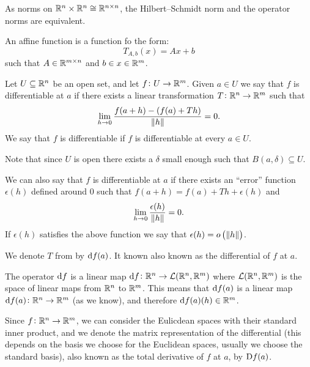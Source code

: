\documentclass[11pt,a4paper]{article}
\begin{document}
\begin{remark}
  As norms on $\mathbb{R}^{n} \times \mathbb{R}^{n} \cong \mathbb{R}^{n \times n}$,
  the Hilbert--Schmidt norm and the operator norms are equivalent.
\end{remark}

\begin{definition}
  An affine function is a function fo the form:
  \[
    T_{A,b}(x) = Ax + b
  \]
  such that $A\in\mathbb{R}^{m \times n}$ and $b\in x\in \mathbb{R}^m$.
\end{definition}
\begin{definition}
  \label{def:differentiable-function}
  Let $U \subseteq \mathbb{R}^n$ be an open set, and let $f \colon U \to \mathbb{R}^m$.
  Given $a \in U$ we say that $f$ is differentiable at $a$ if there exists
  a linear transformation $T \colon \mathbb{R}^n \to \mathbb{R}^m$ such that
  \[
    \lim_{h \to 0} \frac{f(a + h) - (f(a) + Th)}{\left\lVert h\right\rVert} = 0.
  \]
  We say that $f$ is differentiable
  if $f$ is differentiable at every $a \in U$.
\end{definition}
\begin{remark}
  Note that since $U$ is open there exists a $\delta$ small enough such
  that $B(a,\delta) \subseteq U$.
\end{remark}
\begin{remark}
  We can also say that $f$ is differentiable at $a$
  if there exists an ``error''
  function $\epsilon(h)$ defined around $0$ such that 
  $f(a + h) = f(a) + Th + \epsilon(h)$ and
  \[
    \lim_{h \to 0} \frac{\epsilon(h)}{\left\lVert h\right\rVert} = 0.
  \]
  If $\epsilon(h)$ satisfies the above function
  we say that $\epsilon(h) = o\del{\norm{h}}$.
\end{remark}
\begin{remark}
  We denote $T$ from 
  by $\mathrm{d} f(a)$.
  It known also known as the differential of $f$ at $a$.
\end{remark}

\begin{remark}
  The operator $\mathrm{d} f$ is a linear map $\mathrm{d} f \colon \mathbb{R}^n \to \mathcal{L}(\mathbb{R}^n,\mathbb{R}^m)$
  where $\mathcal{L}(\mathbb{R}^n,\mathbb{R}^m)$ is the space of linear maps from $\mathbb{R}^n$ to $\mathbb{R}^m$.
  This means that $\mathrm{d} f(a)$
  is a linear map $\mathrm{d} f(a) \colon \mathbb{R}^n \to \mathbb{R}^m$ (as we know),
  and therefore $\mathrm{d} f(a)(h) \in \mathbb{R}^m$.
\end{remark}

\begin{remark}
  Since $f \colon \mathbb{R}^n \to \mathbb{R}^m$,
  we can consider the Eulicdean spaces with their standard inner product,
  and we denote the matrix representation of the differential
  (this depends on the basis we choose for the Euclidean spaces,
  usually we choose the standard basis),
  also known as the total derivative of $f$ at $a$, by $\mathrm{D} f(a)$.
\end{remark}
\end{document}
